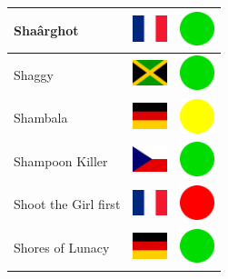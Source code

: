 \documentclass[12pt, a4paper, twoside]{report}
\begin{document}
\begin{center}
\begin{longtable}{|p{5cm}|p{2cm}|p{2cm}|}
Shaârghot & \includegraphics[width=1cm]{4x3/fr} & \includegraphics[width=1cm]{likes/y} \\ \hline
Shaggy & \includegraphics[width=1cm]{4x3/jm} & \includegraphics[width=1cm]{likes/y} \\ \hline
Shambala & \includegraphics[width=1cm]{4x3/de} & \includegraphics[width=1cm]{likes/m} \\ \hline
Shampoon Killer & \includegraphics[width=1cm]{4x3/cz} & \includegraphics[width=1cm]{likes/y} \\ \hline
Shoot the Girl first & \includegraphics[width=1cm]{4x3/fr} & \includegraphics[width=1cm]{likes/n} \\ \hline
Shores of Lunacy & \includegraphics[width=1cm]{4x3/de} & \includegraphics[width=1cm]{likes/y} \\ \hline

\end{longtable}
\end{center}
\end{document}
